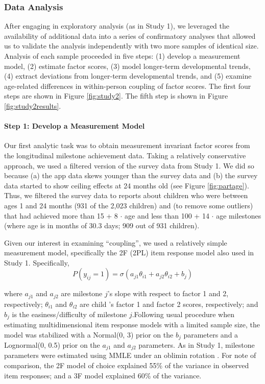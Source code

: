 \documentclass[man, floatsintext]{apa7}
\begin{document}
\subsubsection{Data Analysis}

After engaging in exploratory analysis (as in Study 1), we leveraged the availability of additional data into a series of confirmatory analyses that allowed us to validate the analysis independently with two more samples of identical size. Analysis of each sample proceeded in five steps: (1) develop a measurement model, (2) estimate
factor scores, (3) model longer-term developmental trends, (4) extract
deviations from longer-term developmental trends, and (5) examine
age-related differences in within-person coupling of factor scores. The
first four steps are shown in Figure \ref{fig:study2}. The fifth step is
shown in Figure \ref{fig:study2results}.

\paragraph{Step 1: Develop a Measurement
Model}
Our first analytic task was to obtain measurement invariant factor
scores from the longitudinal milestone achievement data. Taking a
relatively conservative approach, we used a filtered version of the
survey data from Study 1. We did so because (a) the app data skews younger than the
survey data and (b) the survey data started to show ceiling effects at
24 months old (see Figure \ref{fig:partage}). Thus, we filtered
the survey data to reports about children who were between ages 1 and 24 months (931 of the
2,023 children) and (to remove some outliers) that had achieved more than 15 + 8 $\cdot$ age and less
than 100 + 14 $\cdot$ age milestones (where age is in months of 30.3 days; 909
out of 931 children).

Given our interest in examining ``coupling'', we used a relatively simple measurement model, specifically the 2F (2PL) item response model also used in Study 1. Specifically,
\begin{equation}
P(y_{ij} = 1) = \sigma(a_{j1}\theta_{i1} + a_{j2}\theta_{i2} + b_j)
\end{equation}

\noindent where $a_{j1}$ and $a_{j2}$ are milestone $j$'s
slope with respect to factor 1 and 2, respectively; $\theta_{i1}$ and
$\theta_{i2}$ are child 's factor 1 and factor 2 scores, respectively;
and $b_j$ is the easiness/difficulty of milestone $j$.Following usual procedure when estimating
multidimensional item response models with a limited sample size, the model was stabilized with a Normal(0, 3)
prior on the $b_j$ parameters and a Lognormal(0, 0.5) prior on the $a_{j1}$ and
$a_{j2}$ parameters. As in Study 1, milestone
parameters were estimated using MMLE under an oblimin rotation \parencite{jennrich1966}. For note of comparison, the 2F model of choice explained 55\% of the variance in observed item responses; and a 3F model explained 60\% of the variance.
\end{document}
